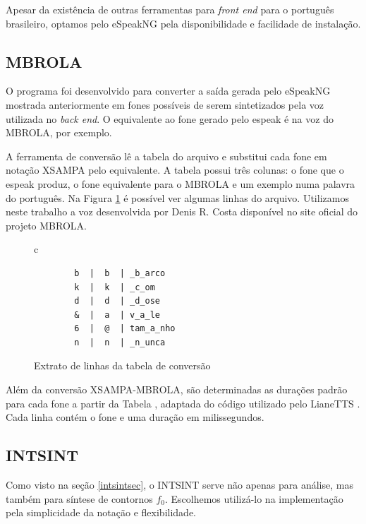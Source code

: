 Apesar da existência de outras ferramentas para \emph{front end} para o
português brasileiro, optamos pelo eSpeakNG pela disponibilidade e facilidade de
instalação.


\subsection{MBROLA}
O programa  foi desenvolvido para converter a saída gerada
pelo eSpeakNG mostrada anteriormente em fones possíveis de serem sintetizados
pela voz utilizada no \emph{back end}. O equivalente ao fone \code{/&/} gerado
pelo espeak é  na voz do MBROLA, por exemplo.

A ferramenta de conversão lê a tabela do arquivo  e
substitui cada fone em notação XSAMPA pelo equivalente. A tabela possui três
colunas: o fone que o espeak produz, o fone equivalente para o MBROLA e um
exemplo numa palavra do português. Na Figura \ref{sampambrola} é possível ver
algumas linhas do arquivo. Utilizamos neste trabalho a voz 
desenvolvida por Denis R. Costa disponível no site oficial do projeto MBROLA.

\begin{figure}[thp]
    \centering
    \begin{tabular}{c}
        \begin{lstlisting}
        b  |  b  | _b_arco
        k  |  k  | _c_om
        d  |  d  | _d_ose
        &  |  a  | v_a_le
        6  |  @  | tam_a_nho
        n  |  n  | _n_unca
        \end{lstlisting}

    \end{tabular}
    \caption{Extrato de linhas da tabela de conversão \label{sampambrola}}
\end{figure}

Além da conversão XSAMPA-MBROLA, são determinadas as durações padrão para cada
fone a partir da Tabela , adaptada do código utilizado pelo
LianeTTS \cite{lianetts}. Cada linha contém o fone e uma duração em milissegundos.

\subsection{INTSINT}
\label{intsintrules}
Como visto na seção \ref{intsintsec}, o INTSINT serve não apenas para análise,
mas também para síntese de contornos $ f_0 $. Escolhemos utilizá-lo na implementação
pela simplicidade da notação e flexibilidade.

